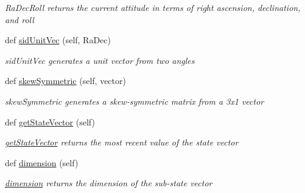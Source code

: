\begin{DoxyCompactItemize}
\begin{DoxyCompactList}\small\item\em Ra\+Dec\+Roll returns the current attitude in terms of right ascension, declination, and roll \end{DoxyCompactList}\item 
def \hyperlink{classAttitudeSubstate_1_1AttitudeState6DOF_ae5afc5e0352e10e5c11e45d5b3fa8f4e}{sid\+Unit\+Vec} (self, Ra\+Dec)
\begin{DoxyCompactList}\small\item\em sid\+Unit\+Vec generates a unit vector from two angles \end{DoxyCompactList}\item 
def \hyperlink{classAttitudeSubstate_1_1AttitudeState6DOF_afe4e6f5ef09bd1fab2e390f3748af76a}{skew\+Symmetric} (self, vector)
\begin{DoxyCompactList}\small\item\em skew\+Symmetric generates a skew-\/symmetric matrix from a 3x1 vector \end{DoxyCompactList}\item 
def \hyperlink{classSubStates_1_1SubState_a3ebd1a120f63ed477ee76999518a8828}{get\+State\+Vector} (self)
\begin{DoxyCompactList}\small\item\em \hyperlink{classSubStates_1_1SubState_a3ebd1a120f63ed477ee76999518a8828}{get\+State\+Vector} returns the most recent value of the state vector \end{DoxyCompactList}\item 
def \hyperlink{classSubStates_1_1SubState_a4aebea19a134cb871a7c0b6c2709546a}{dimension} (self)
\begin{DoxyCompactList}\small\item\em \hyperlink{classSubStates_1_1SubState_a4aebea19a134cb871a7c0b6c2709546a}{dimension} returns the dimension of the sub-\/state vector \end{DoxyCompactList}\end{DoxyCompactItemize}
